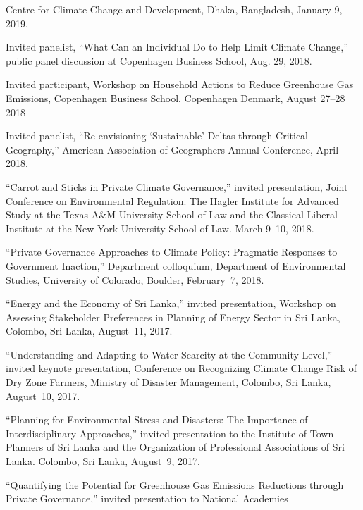   Centre for Climate Change and Development, Dhaka, Bangladesh, January 9, 2019.
\item Invited panelist, ``What Can an Individual Do to Help Limit Climate
  Change,'' public panel discussion at Copenhagen Business School, Aug. 29,
  2018.
\item Invited participant, Workshop on Household Actions to Reduce Greenhouse
  Gas Emissions, Copenhagen Business School, Copenhagen Denmark, August 27--28
  2018
\item Invited panelist, ``Re-envisioning `Sustainable' Deltas through Critical
  Geography,'' American Association of Geographers Annual Conference, April
  2018.
\item ``Carrot and Sticks in Private Climate Governance,'' invited
  presentation, Joint Conference on Environmental Regulation. The Hagler
  Institute for Advanced Study at the Texas A\&M University School of Law and
  the Classical Liberal Institute at the New York University School of Law.
  March 9--10, 2018.
\item ``Private Governance Approaches to Climate Policy: Pragmatic Responses to
  Government Inaction,'' Department colloquium, Department of Environmental
  Studies, University of Colorado, Boulder, February~7, 2018.
\item ``Energy and the Economy of Sri Lanka,'' invited presentation, Workshop
  on Assessing Stakeholder Preferences in Planning of Energy Sector in Sri
  Lanka, Colombo, Sri Lanka, August~11, 2017.
\item ``Understanding and Adapting to Water Scarcity at the Community Level,''
  invited keynote presentation, Conference on Recognizing Climate Change Risk
  of Dry Zone Farmers, Ministry of Disaster Management, Colombo, Sri Lanka,
  August~10, 2017.
\item ``Planning for Environmental Stress and Disasters: The Importance of
  Interdisciplinary Approaches,'' invited presentation to the Institute of Town
  Planners of Sri Lanka and the Organization of Professional Associations of
  Sri Lanka. Colombo, Sri Lanka, August~9, 2017.
\item ``Quantifying the Potential for Greenhouse Gas Emissions Reductions
  through Private Governance,'' invited presentation to National Academies
